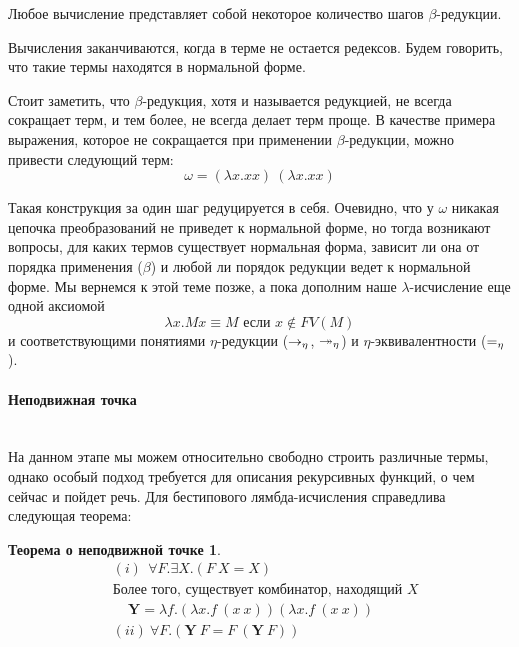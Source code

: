 \documentclass[lambda.tex]{subfiles}
\begin{document}
Любое вычисление представляет собой некоторое количество шагов $\beta$-редукции.

Вычисления заканчиваются, когда в терме не остается редексов. Будем говорить, что такие термы находятся в нормальной форме.

Стоит заметить, что $\beta$-редукция, хотя и называется редукцией, не всегда сокращает терм, и тем более, не всегда делает терм проще. В качестве примера выражения, которое не сокращается при применении $\beta$-редукции, можно привести следующий терм:
\begin{equation*}
	\omega = (\lambda x.xx)\ (\lambda x.xx)
\end{equation*}

Такая конструкция за один шаг редуцируется в себя. Очевидно, что у $\omega$ никакая цепочка преобразований не приведет к нормальной форме, но тогда возникают вопросы, для каких термов существует нормальная форма, зависит ли она от порядка применения ($\beta$) и любой ли порядок редукции ведет к нормальной форме. Мы вернемся к этой теме позже, а пока дополним наше $\lambda$-исчисление еще одной аксиомой
\begin{equation*}
	\lambda x.Mx \equiv M \text{ если }x \not\in FV(M) \tag{$\eta$}
\end{equation*}
и соответствующими понятиями $\eta$-редукции ($\rightarrow_\eta$, $\twoheadrightarrow_\eta$) и $\eta$-эквивалентности ($=_\eta$).

\newpage
\paragraph{Неподвижная точка} %
\label{par:fix point}~\\

На данном этапе мы можем относительно свободно строить различные термы, однако особый подход требуется для описания рекурсивных функций, о чем сейчас и пойдет речь. Для бестипового лямбда-исчисления справедлива следующая теорема:
\newtheorem*{fixpoint}{Теорема о неподвижной точке}
\begin{fixpoint}
\begin{align*}
	&(i)\ \ \forall F. \exists X. (F\ X = X) \\
	&\text{Более того, существует комбинатор, находящий $X$}\\
	&\ \ \ \ \ \boldsymbol{Y} = \lambda f.(\lambda x.f\ (x\ x)) (\lambda x.f\ (x\ x))\\
	&(ii)\ \forall F.(\boldsymbol{Y}\ F=F\ (\boldsymbol{Y}\ F))
\end{align*}
\end{fixpoint}
\end{document}
